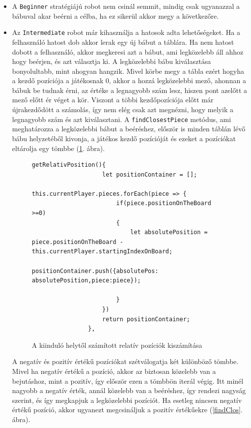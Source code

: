 \documentclass[a4paper,twoside]{article}
\begin{document}
\begin{itemize}
	\item A \verb|Beginner| stratégiájú robot nem csinál semmit, mindig csak ugyanazzal a bábuval akar beérni a célba, ha ez sikerül akkor megy a következőre.
	\item Az \verb|Intermediate| robot már kihasználja a hatosok adta lehetőségeket. Ha a felhasználó hatost dob akkor lerak egy új bábut a táblára. Ha nem hatost dobott a felhasználó, akkor megkeresi azt a bábut, ami legközelebb áll ahhoz hogy beérjen, és azt választja ki. A legközelebbi bábu kiválasztása bonyolultabb, mint ahogyan hangzik. Mivel körbe megy a tábla ezért hogyha a kezdő pozíciója a játékosnak 0, akkor a hozzá legközelebbi mező, ahonnan a bábuk be tudnak érni, az értéke a legnagyobb szám lesz, hiszen pont azelőtt a mező előtt ér véget a kör. Viszont a többi kezdőpozíciója előtt már újrakezdődött a számolás, így nem elég csak azt megnézni, hogy melyik a legnagyobb szám és azt kiválasztani. A \verb|findClosestPiece| metódus, ami meghatározza a legközelebbi bábut a beéréshez, először is minden táblán lévő bábu helyzetéből kivonja, a játékos kezdő pozícióját és ezeket a pozíciókat eltárolja egy tömbbe (\ref{absPos}. ábra).
	\begin{figure}
		\caption{A kiinduló helytől számított relatív pozíciók kiszámítása}
		\begin{minipage}{\textwidth}
			\begin{lstlisting}[style=javascriptStyle]
				getRelativPosition(){
					let positionContainer = [];
					this.currentPlayer.pieces.forEach(piece => {
						if(piece.positionOnTheBoard >=0)
						{
							let absolutePosition = piece.positionOnTheBoard - this.currentPlayer.startingIndexOnBoard;
							positionContainer.push({absolutePos: absolutePosition,piece:piece});
							
						}
					})
					return positionContainer;
				},
			\end{lstlisting}
		\end{minipage}
		
		\label{absPos}
	\end{figure}
	\FloatBarrier
	A negatív és pozitív értékű pozíciókat szétválogatja két különböző tömbbe. Mivel ha negatív értékű a pozíció, akkor az biztosan közelebb van a bejutáshoz, mint a pozitív, így először ezen a tömbbön iterál végig. Itt minél nagyobb a negatív érték, annál közelebb van a beéréshez, így rendezi nagyság szerint, és így megkapjuk a legközelebbi pozíciót. Ha esetleg nincsen negatív értékű pozíció, akkor ugyanezt megcsináljuk a pozitív értékűekre (\ref{findClos}. ábra). 
	

\end{itemize}
\end{document}
